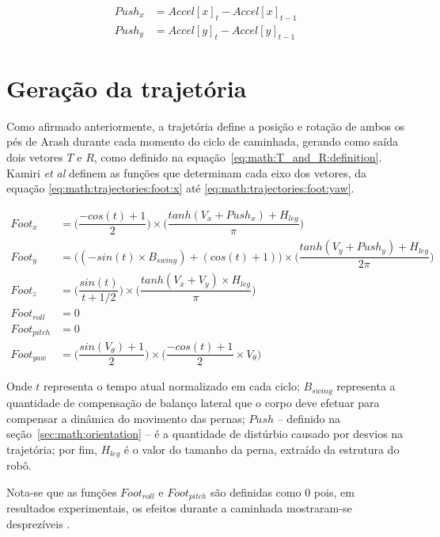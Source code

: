 \begin{align}
	Push_x &= Accel[x]_t - Accel[x]_{t-1} 	 \label{eq:orientation:push:x}   \\
	Push_y &= Accel[y]_t - Accel[y]_{t-1}     \label{eq:orientation:push:y}
\end{align}

\section{Geração da trajetória}
\label{sec:math:trajectories}

Como afirmado anteriormente, a trajetória define a posição e rotação de ambos os pés de Arash durante cada momento do ciclo de caminhada, gerando como saída dois vetores $T$ e $R$, como definido na equação~\ref{eq:math:T_and_R:definition}. Kamiri \textit{et al} definem as funções que determinam cada eixo dos vetores, da equação \ref{eq:math:trajectories:foot:x} até \ref{eq:math:trajectories:foot:yaw}.

\begin{align}
      Foot_x &= \bigg(\dfrac{-cos(t) + 1}{2}\bigg) \times \bigg(\dfrac{tanh(V_x + Push_x) + H_{leg}}{\pi}\bigg)                    \label{eq:math:trajectories:foot:x}  \\
      Foot_y &= \big((-sin(t) \times B_{swing}) + (cos(t) + 1)\big) \times \bigg(\dfrac{tanh(V_y + Push_y) + H_{leg}}{2\pi}\bigg) \\
      Foot_z &= \bigg(\dfrac{sin(t)}{t + 1/2}\bigg) \times \bigg(\dfrac{tanh(V_x + V_y) \times H_{leg}}{\pi}\bigg) \\
 Foot_{roll} &= 0 \\
Foot_{pitch} &= 0 \\
  Foot_{yaw} &= \bigg(\dfrac{sin(V_\theta) + 1}{2}\bigg) \times \bigg(\dfrac{-cos(t) + 1}{2} \times V_\theta\bigg)     \label{eq:math:trajectories:foot:yaw}
\end{align}

Onde $t$ representa o tempo atual normalizado em cada ciclo; $B_{swing}$ representa a quantidade de compensação de balanço lateral que o corpo deve efetuar para compensar a dinâmica do movimento das pernas; $Push$ -- definido na seção~\ref{sec:math:orientation} -- é a quantidade de distúrbio causado por desvios na trajetória; por fim, $H_{leg}$ é o valor do tamanho da perna, extraído da estrutura do robô.

Nota-se que as funções $Foot_{roll}$ e $Foot_{pitch}$ são definidas como $0$ pois, em resultados experimentais, os efeitos durante a caminhada mostraram-se desprezíveis \cite{karimionline}.

